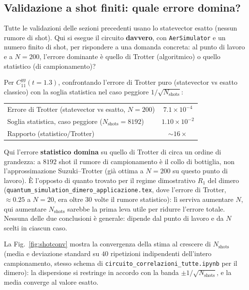 \documentclass[11pt,a4paper]{article}
\begin{document}
\subsection{Validazione a shot finiti: quale errore domina?}
\label{sec:shotnoise}

Tutte le validazioni delle sezioni precedenti usano lo statevector esatto (nessun rumore di
shot). Qui si esegue il circuito \textbf{davvero}, con \texttt{AerSimulator} e un numero finito
di shot, per rispondere a una domanda concreta: al punto di lavoro e a $N=200$, l'errore
dominante è quello di Trotter (algoritmico) o quello statistico (di campionamento)?

Per $C_{11}^{yy}(t{=}1.3)$, confrontando l'errore di Trotter puro (statevector vs esatto
classico) con la soglia statistica nel caso peggiore $1/\sqrt{N_{\text{shots}}}$:
\begin{center}
\begin{tabular}{lc}
\toprule
Errore di Trotter (statevector vs esatto, $N{=}200$) & $7.1\times10^{-4}$\\
Soglia statistica, caso peggiore ($N_{\text{shots}}=8192$) & $1.10\times10^{-2}$\\
Rapporto (statistico/Trotter) & $\sim16\times$\\
\bottomrule
\end{tabular}
\end{center}

\begin{ideabox}
Qui l'errore \textbf{statistico domina} su quello di Trotter di circa un ordine di grandezza:
a $8192$ shot il rumore di campionamento è il collo di bottiglia, non l'approssimazione
Suzuki--Trotter (già ottima a $N{=}200$ su questo punto di lavoro). È l'opposto di quanto trovato
per il regime dimostrativo $R_1$ del dimero
(\texttt{quantum\_simulation\_dimero\_applicazione.tex}, dove l'errore di Trotter, $\approx0.25$
a $N=20$, era oltre 30 volte il rumore statistico): lì serviva aumentare $N$, qui aumentare
$N_{\text{shots}}$ sarebbe la prima leva utile per ridurre l'errore totale. Nessuna delle due
conclusioni è generale: dipende dal punto di lavoro e da $N$ scelti in ciascun caso.
\end{ideabox}

La Fig.~\ref{fig:shotconv} mostra la convergenza della stima al crescere di $N_{\text{shots}}$
(media e deviazione standard su $40$ ripetizioni indipendenti dell'intero campionamento, stesso
schema di \texttt{circuito\_correlazioni\_tutte.ipynb} per il dimero): la dispersione si restringe
in accordo con la banda $\pm1/\sqrt{N_{\text{shots}}}$, e la media converge al valore esatto.
\end{document}
